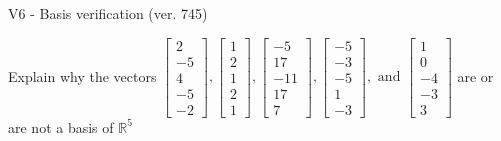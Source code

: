 \begin{exercise}
  \begin{exerciseTitle}V6 - Basis verification (ver. 745)\end{exerciseTitle}
  \begin{exerciseStatement}
    Explain why the vectors \(\left[\begin{array}{r}
2 \\
-5 \\
4 \\
-5 \\
-2
\end{array}\right] , \left[\begin{array}{r}
1 \\
2 \\
1 \\
2 \\
1
\end{array}\right] , \left[\begin{array}{r}
-5 \\
17 \\
-11 \\
17 \\
7
\end{array}\right] , \left[\begin{array}{r}
-5 \\
-3 \\
-5 \\
1 \\
-3
\end{array}\right] , \text{ and } \left[\begin{array}{r}
1 \\
0 \\
-4 \\
-3 \\
3
\end{array}\right]\) are or are not a basis of \(\mathbb{R}^5\)	



\end{exerciseStatement}
\end{exercise}
